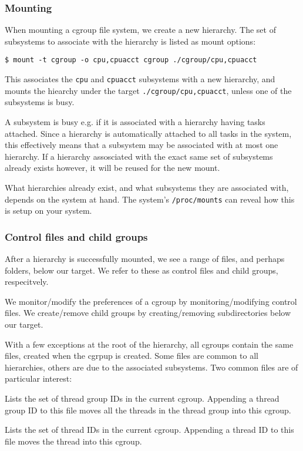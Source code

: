 \subsubsection{Mounting}

When mounting a cgroup file system, we create a new hierarchy. The set of
subsystems to associate with the hierarchy is listed as mount options:

\begin{lstlisting}
$ mount -t cgroup -o cpu,cpuacct cgroup ./cgroup/cpu,cpuacct
\end{lstlisting}

This associates the \texttt{cpu} and \texttt{cpuacct} subsystems with a new
hierarchy, and mounts the hiearchy under the target
\texttt{./cgroup/cpu,cpuacct}, unless one of the subsystems is busy.

A subsystem is busy e.g. if it is associated with a hierarchy having tasks
attached.  Since a hierarchy is automatically attached to all tasks in the
system, this effectively means that a subsystem may be associated with at most
one hierarchy. If a hierarchy assosciated with the exact same set of subsystems
already exists however, it will be reused for the new mount.

What hierarchies already exist, and what subsystems they are associated with,
depends on the system at hand. The system's \texttt{/proc/mounts} can reveal
how this is setup on your system\cite{man-5-proc}.

\subsubsection{Control files and child groups}

After a hierarchy is successfully mounted, we see a range of files, and perhaps
folders, below our target. We refer to these as control files and child groups,
respecitvely.

We monitor/modify the preferences of a cgroup by monitoring/modifying control
files. We create/remove child groups by creating/removing subdirectories below
our target.

With a few exceptions at the root of the hierarchy, all cgroups contain the
same files, created when the cgrpup is created. Some files are common to all
hierarchies, others are due to the associated subsystems. Two common files are
of particular interest:

\begin{description}[\setleftmargin{0.2in}\breaklabel\setlabelstyle{\tt}]

\item [cgroup.procs] Lists the set of thread group IDs in the current cgroup.
Appending a thread group ID to this file moves all the threads in the thread
group into this cgroup.

\item [tasks] Lists the set of thread IDs in the current cgroup. Appending a
thread ID to this file moves the thread into this cgroup.

\end{description}

